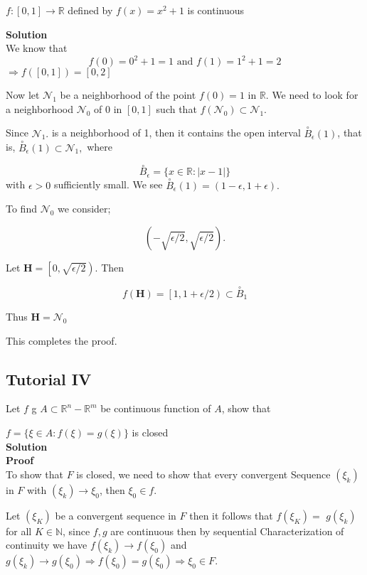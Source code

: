 \documentclass{article}
\begin{document}
$f :  \left[ 0,1\right]  \rightarrow \mathbb{R}$ defined by $f(x)=x^2+1$ is continuous 

\textbf{Solution}\\

We know that 
$$f(0)=0^2+1 =1 \text{ and } f(1)=1^2+1 =2$$
$ \Longrightarrow f(\left[0,1\right]) = \left[  0,2 \right] $


Now let $\mathcal{N}_1$  be a neighborhood of the point $f(0) = 1$ in $\mathbb{R}$. We need to look for a neighborhood $\mathcal{N}_0$ of
0 in $\left[ 0, 1 \right]$ such that $f(\mathcal{N}_0)\subset \mathcal{N}_1.$

Since $\mathcal{N}_1.$ is a neighborhood of 1, then it contains the open interval $\stackrel{\circ}{B}_\epsilon (1)$, that is, $\stackrel{\circ}{B}_\epsilon (1) \subset \mathcal{N}_1,$ where

$$\stackrel{\circ}{B}_\epsilon =\{ x\in \mathbb{R}: \left| x-1\right|\}$$
with $\epsilon > 0$ sufficiently small. We see $\stackrel{\circ}{B}_\epsilon (1) = (1 - \epsilon, 1 + \epsilon).$ 

To find $\mathcal{N}_0$ we consider;

$$ (-\sqrt{\epsilon/2} , \sqrt{\epsilon/2}).$$

Let $\mathbf{H}=\left[0,\sqrt{\epsilon/2}\right).$ Then

$$f\left( \mathbf{H}\right)=\left[1,1+\epsilon/2\right) \subset \stackrel{\circ}{B}_1$$

Thus $\mathbf{H}=\mathcal{N}_0$

This completes the proof. 


\subsection{Tutorial IV}

Let $f$ g $A \subset \mathbb{R}^{n}-\mathbb{R}^{m}$ be continuous function of $A$, show that

$f=\{\xi \in A: f(\xi)=g(\xi)\}$ is closed\\

\textbf{Solution}\\

\textbf{Proof}\\
To show that $F$ is closed, we need to show that every convergent Sequence $\left(\xi_{k}\right)$ in $F$ with $\left(\xi_{k}\right) \rightarrow \xi_{0}$, then $\xi_{0} \in f$.

Let $\left(\xi_{K}\right)$ be a convergent sequence in $F$ then it follows that $f\left(\xi_{K}\right)=$ $g\left(\xi_{k}\right)$ for all $K \in \mathbb{N}$, since $f, g$ are continuous then by sequential Characterization of continuity we have $f\left(\xi_{k}\right) \rightarrow f\left(\xi_{0}\right)$ and $g\left(\xi_{k}\right) \rightarrow g\left(\xi_{0}\right) \Rightarrow f\left(\xi_{0}\right)=g\left(\xi_{0}\right) \Rightarrow \xi_{0} \in F$.
\end{document}
